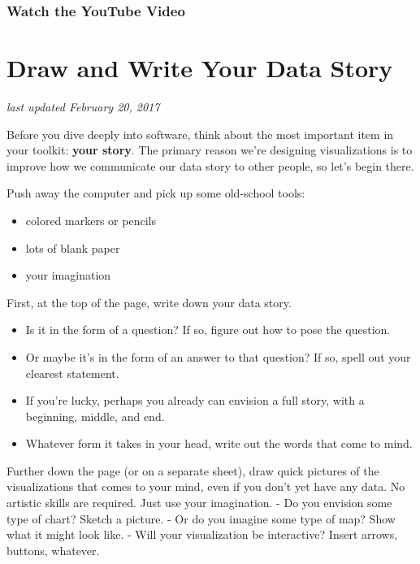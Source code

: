 \documentclass[
  english,
]{book}
\providecommand{\tightlist}{%
  \setlength{\itemsep}{0pt}\setlength{\parskip}{0pt}}
\begin{document}
\hypertarget{watch-the-youtube-video}{%
\subsubsection*{Watch the YouTube Video}\label{watch-the-youtube-video}}

\hypertarget{draw}{%
\section{Draw and Write Your Data Story}\label{draw}}

\emph{last updated February 20, 2017}

Before you dive deeply into software, think about the most important item in your toolkit: \textbf{your story}. The primary reason we're designing visualizations is to improve how we communicate our data story to other people, so let's begin there.

Push away the computer and pick up some old-school tools:

\begin{itemize}
\tightlist
\item
  colored markers or pencils
\item
  lots of blank paper
\item
  your imagination
\end{itemize}

First, at the top of the page, write down your data story.

\begin{itemize}
\tightlist
\item
  Is it in the form of a question? If so, figure out how to pose the question.
\item
  Or maybe it's in the form of an answer to that question? If so, spell out your clearest statement.
\item
  If you're lucky, perhaps you already can envision a full story, with a beginning, middle, and end.
\item
  Whatever form it takes in your head, write out the words that come to mind.
\end{itemize}

Further down the page (or on a separate sheet), draw quick pictures of the visualizations that comes to your mind, even if you don't yet have any data. No artistic skills are required. Just use your imagination.
- Do you envision some type of chart? Sketch a picture.
- Or do you imagine some type of map? Show what it might look like.
- Will your visualization be interactive? Insert arrows, buttons, whatever.
\end{document}
